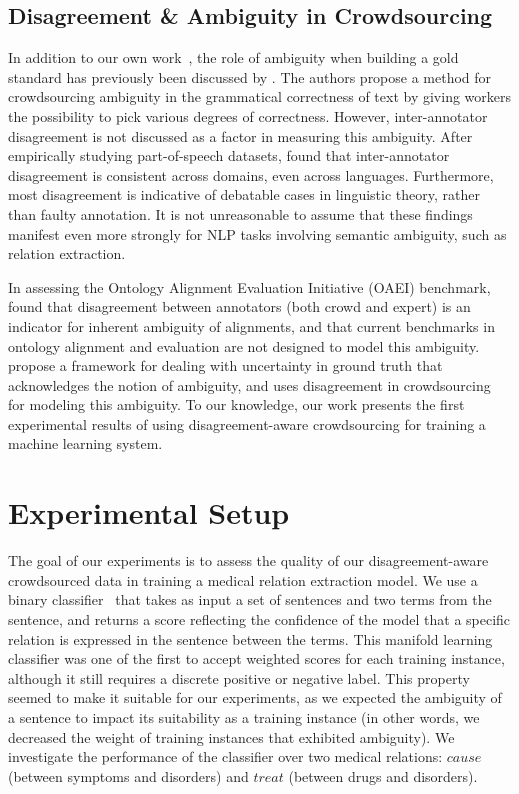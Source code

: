 \subsection{Disagreement \& Ambiguity in Crowdsourcing}

In addition to our own work~\cite{aroyo2013crowd}, the role of ambiguity when building a gold standard has previously been discussed by \citet{lau2014measuring}.  The authors propose a method for crowdsourcing ambiguity in the grammatical correctness of text by giving workers the possibility to pick various degrees of correctness. However, inter-annotator disagreement is not discussed as a factor in measuring this ambiguity. After empirically studying part-of-speech datasets, \citet{plank-hovy-sogaard:2014:P14-2} found that inter-annotator disagreement is consistent across domains, even across languages.  Furthermore, most disagreement is indicative of debatable cases in linguistic theory, rather than faulty annotation.  It is not unreasonable to assume that these findings manifest even more strongly for NLP tasks involving semantic ambiguity, such as relation extraction. 

In assessing the Ontology Alignment Evaluation Initiative (OAEI) benchmark, \citet{cheatham2014conference} found that disagreement between annotators (both crowd and expert) is an indicator for inherent ambiguity of alignments, and that current benchmarks in ontology alignment and evaluation are not designed to model this ambiguity. \citet{schaekermann2016} propose a framework for dealing with uncertainty in ground truth that acknowledges the notion of ambiguity, and uses disagreement in crowdsourcing for modeling this ambiguity. To our knowledge, our work presents the first experimental results of using disagreement-aware crowdsourcing for training a machine learning system.



\section{Experimental Setup}

The goal of our experiments is to assess the quality of our disagreement-aware crowdsourced data in training a medical relation extraction model.  We use a binary classifier~\cite{P14-1078} that takes as input a set of sentences and two terms from the sentence, and returns a score reflecting the confidence of the model that a specific relation is expressed in the sentence between the terms.  This manifold learning classifier was one of the first to accept weighted scores for each training instance, although it still requires a discrete positive or negative label. This property seemed to make it suitable for our experiments, as we expected the ambiguity of a sentence to impact its suitability as a training instance (in other words, we decreased the weight of training instances that exhibited ambiguity).  We investigate the performance of the classifier over two medical relations: $cause$ (between symptoms and disorders) and $treat$ (between drugs and disorders).


